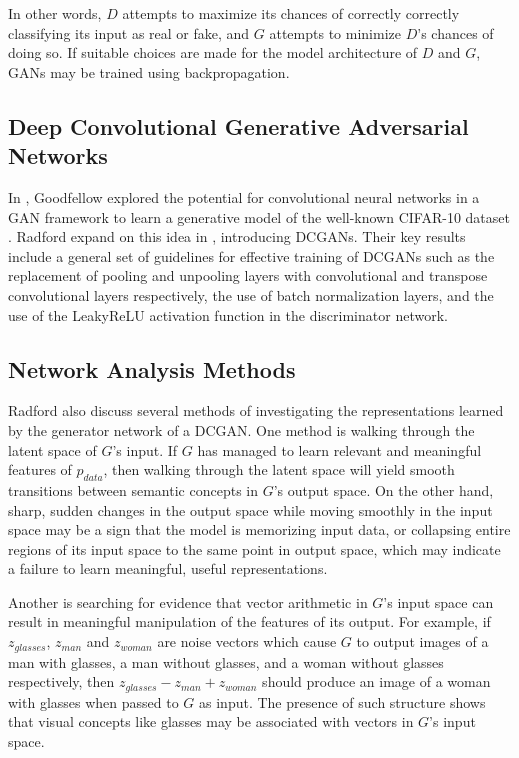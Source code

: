 \documentclass[10pt,twocolumn,letterpaper]{article}
\begin{document}
In other words, $ D $ attempts to maximize its chances of correctly correctly classifying its input
as real or fake, and $ G $ attempts to minimize $ D $'s chances of doing so. If suitable choices
are made for the model architecture of $ D $ and $ G $, GANs may be trained using backpropagation.

\subsection{Deep Convolutional Generative Adversarial Networks}
In \cite{goodfellow2014generative}, Goodfellow \etal explored the potential for convolutional neural
networks in a GAN framework to learn a generative model of the well-known CIFAR-10 dataset
\cite{krizhevsky2014cifar}. Radford \etal expand on this idea in \cite{radford2015unsupervised},
introducing DCGANs. Their key results include a general set of guidelines for effective training of
DCGANs such as the replacement of pooling and unpooling layers with convolutional and transpose
convolutional layers respectively, the use of batch normalization layers, and the use of the LeakyReLU
activation function \cite{maas2013rectifier} in the discriminator network.

\subsection{Network Analysis Methods}
Radford \etal also discuss several methods of investigating the representations learned by the generator
network of a DCGAN. One method is walking through the latent space of $ G $'s input. If $ G $ has managed
to learn relevant and meaningful features of $ p_{data} $, then walking through the latent space will
yield smooth transitions between semantic concepts in $ G $'s output space. On the other hand, sharp, sudden changes in the output space while moving smoothly in the input space may be a sign that the model is memorizing input data, or collapsing entire regions of its input space to the same point in output space, which may indicate a failure to learn meaningful, useful representations.

Another is searching for evidence that vector arithmetic in $ G $'s input space can result in meaningful
manipulation of the features of its output. For example, if $ z_{glasses} $, $ z_{man} $ and $ z_{woman} $
are noise vectors which cause $ G $ to output images of a man with glasses, a man without glasses, and a
woman without glasses respectively, then $ z_{glasses} - z_{man} + z_{woman} $ should produce an image of
a woman with glasses when passed to $ G $ as input. The presence of such structure shows that visual concepts
like glasses may be associated with vectors in $ G $'s input space.
\end{document}
